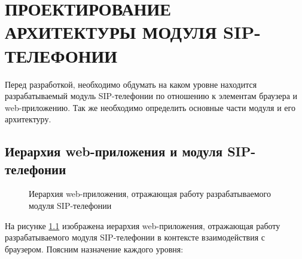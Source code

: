 \chapter{ПРОЕКТИРОВАНИЕ АРХИТЕКТУРЫ МОДУЛЯ SIP-ТЕЛЕФОНИИ}

Перед разработкой, необходимо обдумать на каком уровне находится разрабатываемый модуль SIP-телефонии по отношению к элементам браузера и web-приложению. Так же необходимо определить основные части модуля и его архитектуру.

\section{Иерархия web-приложения и модуля SIP-телефонии}

\begin{figure}[h!]
\caption{Иерархия web-приложения, отражающая работу разрабатываемого модуля SIP-телефонии}
\label{image:modulesStructure}
\end{figure}

На рисунке \ref{image:modulesStructure} изображена иерархия web-приложения, отражающая работу разрабатываемого модуля SIP-телефонии в контексте взаимодействия с браузером. Поясним назначение каждого уровня:


